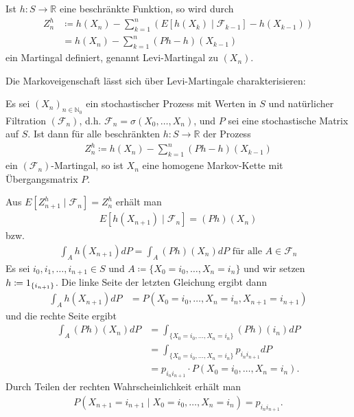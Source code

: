 \documentclass[a4paper,twoside,DIV15,BCOR12mm]{scrbook}
\newcommand{\cF}{\mathcal F}
\begin{document}
\begin{bemerkung}
Ist $h:S\to \mathbb R$ eine beschränkte Funktion, so wird durch
\begin{align*}
Z_n^h &\coloneqq h(X_n) - \sum_{k=1}^n (E[h(X_k)\mid \cF_{k-1}] - h(X_{k-1})) \\
&= h(X_n) - \sum_{k=1}^n (Ph-h)(X_{k-1})
\end{align*}
ein Martingal definiert, genannt Levi-Martingal zu $(X_n)$.
\end{bemerkung}

Die Markoveigenschaft lässt sich über Levi-Martingale charakterisieren:

\begin{satz}
Es sei $(X_n)_{n\in\mathbb N_0}$ ein stochastischer Prozess mit Werten in $S$ und natürlicher Filtration $(\cF_n)$, d.h. $\cF_n=\sigma(X_0,\ldots,X_n)$, und $P$ sei eine stochastische Matrix auf $S$. Ist dann für alle beschränkten $h:S\to \mathbb R$ der Prozess
\begin{align*}
Z_n^h\coloneqq h(X_n) - \sum_{k=1}^n (Ph-h)(X_{k-1})
\end{align*}
ein $(\cF_n)$-Martingal, so ist $X_n$ eine homogene Markov-Kette mit Übergangsmatrix $P$.
\end{satz}

\begin{beweis}
Aus $E[Z_{n+1}^h\mid \cF_n] = Z_n^h$ erhält man 
\begin{align*}
E[h(X_{n+1})\mid \cF_n] = (Ph)(X_n)
\end{align*}
bzw. 
\begin{align*}
\int_A h(X_{n+1})dP = \int_A (Ph)(X_n)dP \text{ für alle }A\in \cF_n
\end{align*}
Es sei $i_0,i_1,\ldots,i_{n+1}\in S$ und $A\coloneqq \{X_0 = i_0,\ldots,X_n=i_n\}$ und wir setzen $h\da 1_{\{i_{n+1}\}}$. Die linke Seite der letzten Gleichung ergibt dann 
\begin{align*}
\int_A h(X_{n+1})dP &= P(X_0=i_0,\ldots,X_n=i_n,X_{n+1}=i_{n+1})
\end{align*}
und die rechte Seite ergibt
\begin{align*}
\int_A (Ph)(X_n)dP &= \int_{\{X_0=i_0,\ldots,X_n=i_n\}} (Ph)(i_n)dP \\
&= \int_{\{X_0=i_0,\ldots,X_n=i_n\}} p_{i_ni_{n+1}}dP \\
&= p_{i_ni_{n+1}} \cdot P(X_0=i_0,\ldots,X_n=i_n).
\end{align*}
Durch Teilen der rechten Wahrscheinlichkeit erhält man
\begin{align*}
P(X_{n+1}=i_{n+1} \mid X_0=i_0,\ldots,X_n=i_n) = p_{i_ni_{n+1}}.
\end{align*}
\end{beweis}
\end{document}
